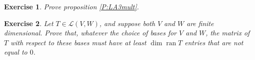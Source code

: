 \documentclass{article}
\theoremstyle{plain}
\newtheorem{Q}{Exercise}{\bfseries}{\upshape}
\newcommand{\cL}{\mathcal{L}}
\DeclareMathOperator{\ran}{\mathrm{ran}}
\begin{document}
\begin{Q}\label{\prefix Q:LA3mult}
Prove proposition \ref{P:LA3mult}.
\end{Q}
\begin{comment}
\textbf{Solution:}
What should the transformation $TS$ do to the basis vector $u_i$ of $U$? As $A$ is the matrix of $S$, to find $Su_i$ we look at what $A$ does to the column vector that is zeroes except for 1 in the $i$th place. So the result is $a_{1i}v_1 + \ldots + a_{mi}v_m$. What does $T$ do to a basis vector $v_j$ of $V$? Now we look at the matrix $B$, which tells us that $T(v_j) = b_{1j}w_1+\ldots+ b_{pj}w_p$. So, 
\begin{align*}TS(u_i) &= T(a_{1i}v_1 + \ldots + a_{mi}v_m)\\
&= a_{1i}T(v_1)+\ldots + a_{mi}T(v_m)\\
&=a_{1i}(b_{11}w_1+\ldots+ b_{p1}w_p) + \ldots + a_{mi}(b_{1m}w_1+\ldots+ b_{pm}w_p). \end{align*}

We can rearrange this as
\begin{align*}&(a_{1i}b_{11} + \ldots + a_{mi}b_{1m})w_1\\
+&(a_{1i}b_{21} + \ldots + a_{mi}b_{2m})w_2\\ 
+& \ldots\\
+&(a_{1i}b_{p1}+\ldots +a_{mi}b_{pm})w_p.\end{align*}
But 
\[\begin{bmatrix}
a_{1i}b_{11} + \ldots + a_{mi}b_{1m}\\
a_{1i}b_{21} + \ldots + a_{mi}b_{2m}\\
\vdots\\
a_{1i}b_{p1}+\ldots +a_{mi}b_{pm}
\end{bmatrix}
\]
is the $i$th column of the matrix $BA$. Since this is true for every basis vector $u_i$ of $U$, the transformation $TS$ is given by the matrix $BA$ as claimed.
\end{comment}

\begin{Q}
Let $T\in\cL(V,W)$, and suppose both $V$ and $W$ are finite dimensional. Prove that, whatever the choice of bases for $V$ and $W$, the matrix of $T$ with respect to these bases must have at least $\dim \ran T$ entries that are not equal to $0$.
\end{Q}
\begin{comment}
\textbf{Solution:}
Let $A$ be the matrix of $T$ with respect to some pair of bases. If the $i$th column of $A$ is all zeroes, then this means $T(v_i)=0$, where $v_i$ is the $i$th basis vector for $V$. Since $(T(v_1),\ldots,T(v_n))$ spans $\ran T$, there must be at least $\dim\ran T$ columns of $A$ that are not all zeroes. This requires at least $\dim\ran T$ non-zero entries.
\end{comment}
\end{document}
